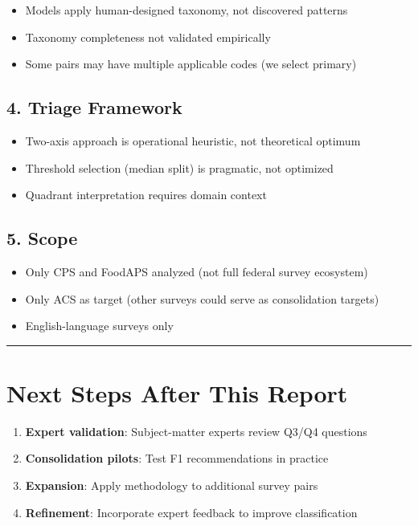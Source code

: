 \documentclass[
  letterpaper,
]{report}
\providecommand{\tightlist}{%
  \setlength{\itemsep}{0pt}\setlength{\parskip}{0pt}}
\begin{document}
\begin{itemize}
\tightlist
\item
  Models apply human-designed taxonomy, not discovered patterns
\item
  Taxonomy completeness not validated empirically
\item
  Some pairs may have multiple applicable codes (we select primary)
\end{itemize}

\subsection{4. Triage Framework}\label{triage-framework}

\begin{itemize}
\tightlist
\item
  Two-axis approach is operational heuristic, not theoretical optimum
\item
  Threshold selection (median split) is pragmatic, not optimized
\item
  Quadrant interpretation requires domain context
\end{itemize}

\subsection{5. Scope}\label{scope-1}

\begin{itemize}
\tightlist
\item
  Only CPS and FoodAPS analyzed (not full federal survey ecosystem)
\item
  Only ACS as target (other surveys could serve as consolidation
  targets)
\item
  English-language surveys only
\end{itemize}

\begin{center}\rule{0.5\linewidth}{0.5pt}\end{center}

\section{Next Steps After This
Report}\label{next-steps-after-this-report}

\begin{enumerate}
\def\labelenumi{\arabic{enumi}.}
\tightlist
\item
  \textbf{Expert validation}: Subject-matter experts review Q3/Q4
  questions
\item
  \textbf{Consolidation pilots}: Test F1 recommendations in practice
\item
  \textbf{Expansion}: Apply methodology to additional survey pairs
\item
  \textbf{Refinement}: Incorporate expert feedback to improve
  classification
\end{enumerate}
\end{document}
